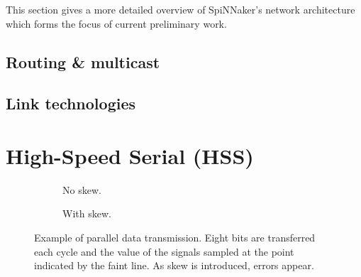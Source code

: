 		This section gives a more detailed overview of SpiNNaker's network
		architecture which forms the focus of current preliminary work.
		
		\subsection{Routing \& multicast}
			
		
		\subsection{Link technologies}
			
	
	\section{High-Speed Serial (HSS)}
		\label{sec:high-speed-serial}
		
		
		\begin{figure}
			\begin{subfigure}{0.48\textwidth}
				\center
				\begin{tikzpicture}[thick, node distance=0.2cm, xscale=0.40]
					
					
					
				\end{tikzpicture}
				
				\caption{No skew.}
				\label{fig:parcons-no-skew}
			\end{subfigure}
			\begin{subfigure}{0.48\textwidth}
				\center
				\begin{tikzpicture}[thick, node distance=0.2cm, xscale=0.40]
					
					
					
				\end{tikzpicture}
				
				\caption{With skew.}
				\label{fig:parcons-with-skew}
			\end{subfigure}
			
			\caption[Parallel signalling example.]{Example of parallel data
			transmission. Eight bits are transferred each cycle and the value of the
			signals sampled at the point indicated by the faint line. As skew is
			introduced, errors appear.}
			\label{fig:parcons} \end{figure}
		
